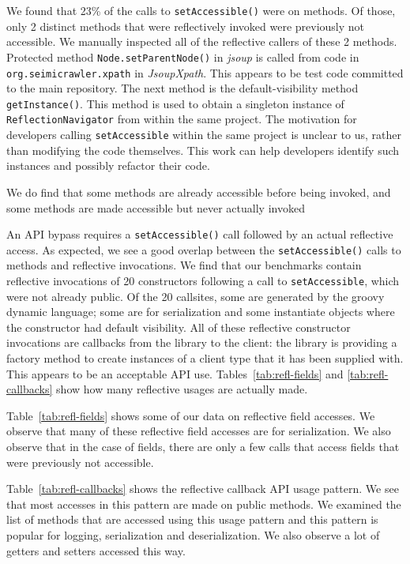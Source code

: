 We found that 23\% of the calls to \texttt{setAccessible()} were on methods. Of those, only 2 distinct methods that were reflectively invoked were previously not accessible. We manually inspected all of the reflective callers of these 2 methods. Protected method \texttt{Node.setParentNode()} in \emph{jsoup} is called from code in \texttt{org.seimicrawler.xpath} in \emph{JsoupXpath}. This appears to be test code committed to the main repository. The next method is the default-visibility method \texttt{getInstance()}. This method is used to obtain a singleton instance of {\tt ReflectionNavigator} from within the same project. The motivation for developers calling \texttt{setAccessible} within the same project is unclear to us, rather than modifying the code themselves. This work can help developers identify such instances and possibly refactor their code.

We do find that some methods are already accessible before being invoked, and some methods are made accessible but never actually invoked

An API bypass requires a \texttt{setAccessible()} call followed by an
actual reflective access.  As expected, we see a good overlap between the
\texttt{setAccessible()} calls to methods and reflective invocations.
We find that our benchmarks contain reflective invocations of 20 constructors following a call to \texttt{setAccessible}, which were not already public. Of the 20 callsites, some are generated by the
groovy dynamic language; some are for serialization and some instantiate objects where the constructor had default visibility. All of these reflective constructor invocations are callbacks from the library to the client: the library is providing a factory method to create instances of a client type that it has been supplied with. This appears to be an acceptable API use.
Tables~\ref{tab:refl-fields} and \ref{tab:refl-callbacks} show how many reflective usages are actually made.

Table~\ref{tab:refl-fields} shows some of our data on reflective field accesses. We observe that many of these reflective field accesses are for serialization. We also observe that in the case of fields, there are only a few calls that access fields that were previously not accessible.


Table~\ref{tab:refl-callbacks} shows the reflective callback API usage pattern. We see that most accesses in this pattern are made on public methods. We examined the list of methods that are accessed using this usage pattern and this pattern is popular for logging, serialization and deserialization. We also observe a lot of getters and setters accessed this way.



